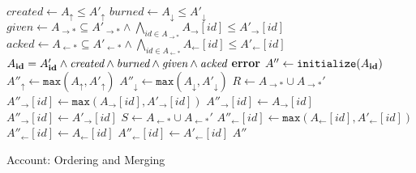 \documentclass[9pt]{article}   	%
\begin{document}
\begin{algorithm}
\begin{algorithmic}[1]
     
        \State $\textit{created} \leftarrow A_\uparrow \leq A'_\uparrow$
        \State $\textit{burned} \leftarrow A_\downarrow \leq A'_\downarrow$
        \State $\textit{given} \leftarrow A_{\rightarrow *} \subseteq A'_{\rightarrow *} \wedge \bigwedge\limits_{id \in A_{\rightarrow *}} A_{\rightarrow}[id] \leq A'_{\rightarrow}[id]$ 
        \State $\textit{acked} \leftarrow A_{\leftarrow *} \subseteq A'_{\leftarrow *} \wedge \bigwedge\limits_{id \in A_{\leftarrow *}} A_{\leftarrow}[id] \leq A'_{\leftarrow}[id]$
        \State \Return $A_{\footnotesize \textbf{id}} = A'_{\footnotesize \textbf{id}} \wedge \textit{created} \wedge \textit{burned} \wedge \textit{given} \wedge \textit{acked}$
    \EndFunction
    \State
     
		\textbf{error}
	\EndIf
	\State
        \State $A'' \leftarrow \texttt{initialize}(A_{\footnotesize \textbf{id}})$
        \State $A''_\uparrow \leftarrow \texttt{max}(A_\uparrow, A'_\uparrow)$
        \State $A''_\downarrow \leftarrow \texttt{max}(A_\downarrow, A'_\downarrow)$ 
        \State
        \State $R \leftarrow A_{\rightarrow *} \cup A_{\rightarrow *}'$ 
			\State $A''_{\rightarrow}[id] \leftarrow \texttt{max}(A_{\rightarrow}[id], A'_{\rightarrow}[id])$
			\State $A''_{\rightarrow}[id] \leftarrow A_{\rightarrow}[id]$
		\Else
			\State $A''_{\rightarrow}[id] \leftarrow A'_{\rightarrow}[id]$
		\EndIf
	\EndFor
	\State
	\State $S \leftarrow A_{\leftarrow *} \cup A_{\leftarrow *}'$ 
			\State $A''_{\leftarrow}[id] \leftarrow \texttt{max}(A_{\leftarrow}[id], A'_{\leftarrow}[id])$
			\State $A''_{\leftarrow}[id] \leftarrow A_{\leftarrow}[id]$
		\Else
			\State $A''_{\leftarrow}[id] \leftarrow A'_{\leftarrow}[id]$
		\EndIf
	\EndFor
	\State
	\State \Return $A''$	
    \EndFunction
\end{algorithmic}
\caption{\label{alg:account-ordering} Account: Ordering and Merging}
\end{algorithm}
\end{document}
